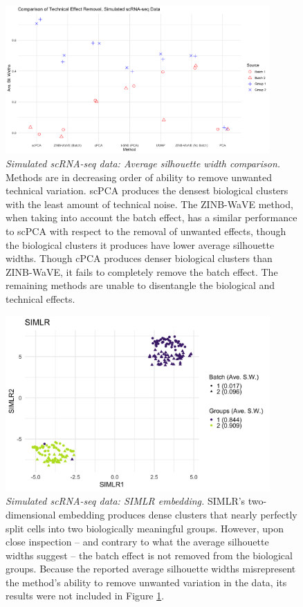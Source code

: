 \documentclass{article}
\begin{document}
\begin{figure}[!htbp]
    \centering
    \includegraphics[width=0.9\textwidth]{figures/technical_effect_removal_sim}
    \caption{{\em Simulated scRNA-seq data: Average silhouette width comparison.}
    Methods are in decreasing order of ability to remove unwanted technical variation. scPCA produces the densest biological clusters with the least amount of technical noise. The ZINB-WaVE method, when taking into account the batch effect, has a similar performance to scPCA with respect to the removal of unwanted effects, though the biological clusters it produces have lower average silhouette widths. Though cPCA produces denser biological clusters than ZINB-WaVE, it fails to completely remove the batch effect. The remaining methods are unable to disentangle the biological and technical effects. 
    }
    \label{fig:ave_sil_widths}
\end{figure}

\begin{figure}[!htbp]
    \centering
    \includegraphics[width=0.9\textwidth]{figures/simulated_SIMLR.png}
    \caption{
    {\em Simulated scRNA-seq data: SIMLR embedding.}
     SIMLR's two-dimensional embedding produces dense clusters that nearly perfectly split cells into two biologically meaningful groups. However, upon close inspection -- and contrary to what the average silhouette widths suggest -- the batch effect is not removed from the biological groups. Because the reported average silhouette widths misrepresent the method's ability to remove unwanted variation in the data, its results were not included in Figure \ref{fig:ave_sil_widths}.}
    \label{fig:simulated_SIMLR}
\end{figure}
\end{document}
